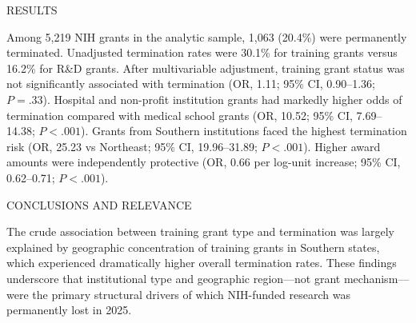 \documentclass[10pt, letterpaper]{article}
\newcommand{\abslabel}[1]{%
  {\vspace{4pt}\noindent\sffamily\fontseries{b}\selectfont\fontsize{8.5}{10}\selectfont #1\enspace}%
}
\newcommand{\absrule}{%
  \vspace{3pt}\noindent{\color{jamacrimson}\rule{0.62\textwidth}{0.4pt}}\vspace{3pt}%
}
\begin{document}
\begin{minipage}[t]{0.62\textwidth}
\absrule

\abslabel{RESULTS}
{\fontsize{9}{11.5}\selectfont
Among 5,219 NIH grants in the analytic sample, 1,063 (20.4\%) were permanently terminated. Unadjusted termination rates were 30.1\% for training grants versus 16.2\% for R\&D grants. After multivariable adjustment, training grant status was not significantly associated with termination (OR, 1.11; 95\% CI, 0.90--1.36; $P = .33$). Hospital and non-profit institution grants had markedly higher odds of termination compared with medical school grants (OR, 10.52; 95\% CI, 7.69--14.38; $P < .001$). Grants from Southern institutions faced the highest termination risk (OR, 25.23 vs Northeast; 95\% CI, 19.96--31.89; $P < .001$). Higher award amounts were independently protective (OR, 0.66 per log-unit increase; 95\% CI, 0.62--0.71; $P < .001$).\par}

\absrule

\abslabel{CONCLUSIONS AND RELEVANCE}
{\fontsize{9}{11.5}\selectfont
The crude association between training grant type and termination was largely explained by geographic concentration of training grants in Southern states, which experienced dramatically higher overall termination rates. These findings underscore that institutional type and geographic region---not grant mechanism---were the primary structural drivers of which NIH-funded research was permanently lost in 2025.\par}

\vspace{4pt}
\noindent{\color{jamalightgray}\rule{0.62\textwidth}{0.4pt}}

\end{minipage}%
\hfill
\end{document}
